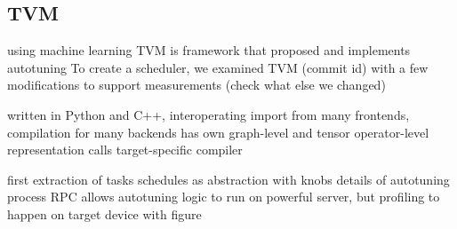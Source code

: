 \subsection{TVM}
using machine learning
TVM is framework that proposed and implements autotuning
To create a scheduler, we examined TVM (commit id) with a few modifications to support measurements (check what else we changed)

written in Python and C++, interoperating
import from many frontends, compilation for many backends
has own graph-level and tensor operator-level representation
calls target-specific compiler

first extraction of tasks
schedules as abstraction with knobs
details of autotuning process
RPC allows autotuning logic to run on powerful server, but profiling to happen on target device
with figure


